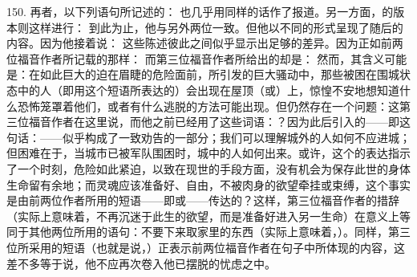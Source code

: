 150. 再者，以下列语句所记述的： 也几乎用同样的话作了报道。另一方面，的版本则这样进行： 到此为止，他与另外两位一致。但他以不同的形式呈现了随后的内容。因为他接着说： 这些陈述彼此之间似乎显示出足够的差异。因为正如前两位福音作者所记载的那样： 而第三位福音作者所给出的却是： 然而，其含义可能是：在如此巨大的迫在眉睫的危险面前，所引发的巨大骚动中，那些被困在围城状态中的人（即用这个短语所表达的）会出现在屋顶（或）上，惊惶不安地想知道什么恐怖笼罩着他们，或者有什么逃脱的方法可能出现。但仍然存在一个问题：这第三位福音作者在这里说，而他之前已经用了这些词语：？因为此后引入的——即这句话：——似乎构成了一致劝告的一部分；我们可以理解城外的人如何不应进城；但困难在于，当城市已被军队围困时，城中的人如何出来。或许，这个的表达指示了一个时刻，危险如此紧迫，以致在现世的手段方面，没有机会为保存此世的身体生命留有余地；而灵魂应该准备好、自由，不被肉身的欲望牵挂或束缚，这个事实是由前两位作者所用的短语——即或——传达的？这样，第三位福音作者的措辞（实际上意味着，不再沉迷于此生的欲望，而是准备好进入另一生命）在意义上等同于其他两位所用的语句：不要下来取家里的东西（实际上意味着，）。同样，第三位所采用的短语（也就是说，）正表示前两位福音作者在句子中所体现的内容，这差不多等于说，他不应再次卷入他已摆脱的忧虑之中。\par

